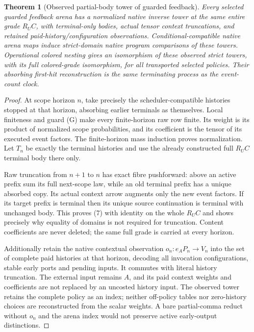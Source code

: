 \documentclass[11pt]{article}
\newtheorem{theorem}{Theorem}\newtheorem{proposition}[theorem]{Proposition}
\begin{document}
\begin{theorem}[Observed partial-body tower of guarded feedback]
Every selected guarded feedback arena has a normalized native inverse tower at the \emph{same entire} grade $R_UC$, with terminal-only bodies, actual tensor context truncations, and retained paid-history/configuration observations. Conditional-compatible native arena maps induce strict-domain native program comparisons of these towers. Operational colored nesting gives an isomorphism of these observed strict towers, with its full colored-grade isomorphism, for all transported selected policies. Their absorbing first-hit reconstruction is the same terminating process as the event-count clock.
\end{theorem}
\begin{proof}
At scope horizon $n$, take precisely the scheduler-compatible histories stopped at that horizon, absorbing earlier terminals as themselves. Local finiteness and guard (G) make every finite-horizon raw row finite. Its weight is its product of normalized scope probabilities, and its coefficient is the tensor of its executed event factors. The finite-horizon mass induction proves normalization. Let $T_n$ be exactly the terminal histories and use the already constructed full $R_UC$ terminal body there only.

Raw truncation from $n+1$ to $n$ has exact fibre pushforward: above an active prefix sum its full next-scope law, while an old terminal prefix has a unique absorbed copy. Its actual context arrow augments only the new event factors. If its target prefix is terminal then its unique source continuation is terminal with unchanged body. This proves (7) with identity on the whole $R_UC$ and shows precisely why equality of domains is not required for truncation. Content coefficients are never deleted; the same full grade is carried at every horizon.

Additionally retain the native contextual observation $o_n:e_AP_n\to V_n$ into the set of complete paid histories at that horizon, decoding all invocation configurations, stable early ports and pending inputs. It commutes with literal history truncation. The external input remains $A$, and its paid context weights and coefficients are not replaced by an uncosted history input. The observed tower retains the complete policy as an index; neither off-policy tables nor zero-history choices are reconstructed from the scalar weights. A bare partial-comma reduct without $o_n$ and the arena index would not preserve active early-output distinctions.


\end{proof}
\end{document}
